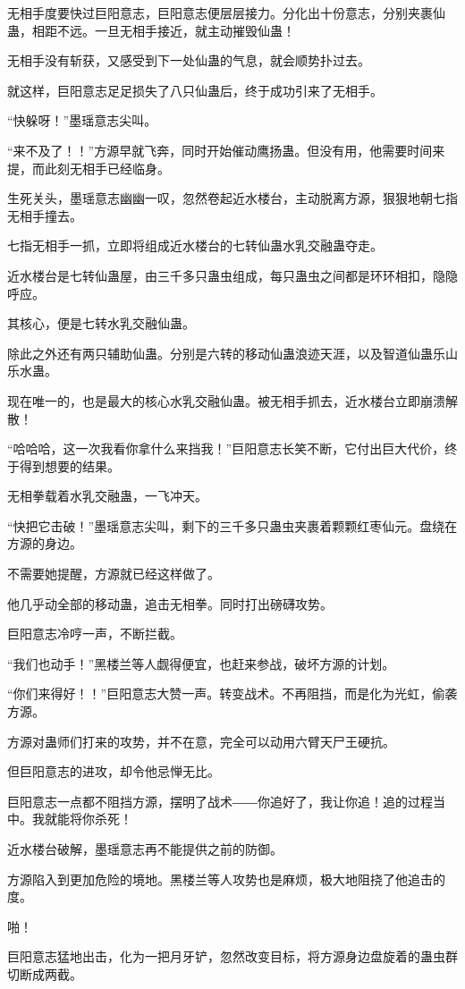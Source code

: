 \begin{this_body}
无相手度要快过巨阳意志，巨阳意志便层层接力。分化出十份意志，分别夹裹仙蛊，相距不远。一旦无相手接近，就主动摧毁仙蛊！

无相手没有斩获，又感受到下一处仙蛊的气息，就会顺势扑过去。

就这样，巨阳意志足足损失了八只仙蛊后，终于成功引来了无相手。

“快躲呀！”墨瑶意志尖叫。

“来不及了！！”方源早就飞奔，同时开始催动鹰扬蛊。但没有用，他需要时间来提，而此刻无相手已经临身。

生死关头，墨瑶意志幽幽一叹，忽然卷起近水楼台，主动脱离方源，狠狠地朝七指无相手撞去。

七指无相手一抓，立即将组成近水楼台的七转仙蛊水乳交融蛊夺走。

近水楼台是七转仙蛊屋，由三千多只蛊虫组成，每只蛊虫之间都是环环相扣，隐隐呼应。

其核心，便是七转水乳交融仙蛊。

除此之外还有两只辅助仙蛊。分别是六转的移动仙蛊浪迹天涯，以及智道仙蛊乐山乐水蛊。

现在唯一的，也是最大的核心水乳交融仙蛊。被无相手抓去，近水楼台立即崩溃解散！

“哈哈哈，这一次我看你拿什么来挡我！”巨阳意志长笑不断，它付出巨大代价，终于得到想要的结果。

无相拳载着水乳交融蛊，一飞冲天。

“快把它击破！”墨瑶意志尖叫，剩下的三千多只蛊虫夹裹着颗颗红枣仙元。盘绕在方源的身边。

不需要她提醒，方源就已经这样做了。

他几乎动全部的移动蛊，追击无相拳。同时打出磅礴攻势。

巨阳意志冷哼一声，不断拦截。

“我们也动手！”黑楼兰等人觑得便宜，也赶来参战，破坏方源的计划。

“你们来得好！！”巨阳意志大赞一声。转变战术。不再阻挡，而是化为光虹，偷袭方源。

方源对蛊师们打来的攻势，并不在意，完全可以动用六臂天尸王硬抗。

但巨阳意志的进攻，却令他忌惮无比。

巨阳意志一点都不阻挡方源，摆明了战术――你追好了，我让你追！追的过程当中。我就能将你杀死！

近水楼台破解，墨瑶意志再不能提供之前的防御。

方源陷入到更加危险的境地。黑楼兰等人攻势也是麻烦，极大地阻挠了他追击的度。

啪！

巨阳意志猛地出击，化为一把月牙铲，忽然改变目标，将方源身边盘旋着的蛊虫群切断成两截。


\end{this_body}
